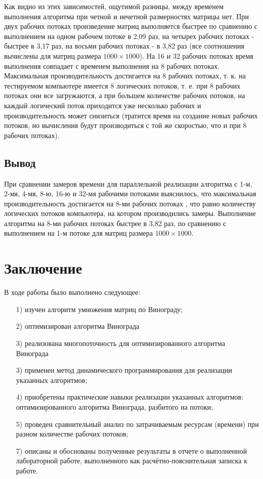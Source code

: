 \documentclass[a4paper,14pt]{article}
\begin{document}
        
        Как видно из этих зависимостей, ощутимой разницы, между временем выполнения алгоритма при четной и нечетной размерностях матрицы нет. При двух рабочих потоках произведение матриц выполняется быстрее по сравнению с выполнением на одном рабочем потоке в 2,09 раз, на четырех рабочих потоках - быстрее в 3,17 раз, на восьми рабочих потоках - в 3,82 раз (все соотношения вычислены для матриц размера $1000 \times 1000$). На 16 и 32 рабочих потоках время выполнения совпадает с временем выполнения на 8 рабочих потоках. Максимальная производительность достигается на 8 рабочих потоках, т. к. на тестируемом компьютере имеется 8 логических потоков, т. е. при 8 рабочих потоках они все загружаются, а при большем количестве рабочих потоков, на каждый логический поток приходится уже несколько рабочих и производительность может снизиться (тратится время на создание новых рабочих потоков, но вычисления будут производиться с той же скоростью, что и при 8 рабочих потоках).
        
     
        
       \subsection*{Вывод}
        При сравнении замеров времени для параллельной реализации алгоритма с 1-м, 2-мя, 4-мя, 8-ю, 16-ю и 32-мя рабочими потоками выяснилось, что максимальная производительность достигается на 8-ми рабочих потоках , что равно количеству логических потоков компьютера, на котором производились замеры. Выполнение алгоритма на 8-ми рабочих потоках быстрее в 3,82 раз, по сравнению с выполнением на 1-м потоке для матриц размера $1000 \times 1000$.
        
    

\pagebreak
\section*{Заключение}
	В ходе работы было выполнено следующее:
	\begin{enumerate} 
	\item[1)] изучен алгоритм умножения матриц по Винограду;
	\item[2)] оптимизирован алгоритма Винограда
	\item[3)] реализована многопоточность для оптимизированного алгоритма Винограда
	\item[3)] применен метод динамического программирования для реализации указанных алгоритмов;
	\item[4)] приобретены практические навыки реализации указанных алгоритмов: оптимизированного алгоритма Винограда, разбитого на потоки;
	\item[5)] проведен сравнительный анализ по затрачиваемым ресурсам (времени) при разном количестве рабочих потоков;
	\item[7)] описаны и обоснованы полученные результаты в отчете о выполненной лабораторной работе, выполненного как расчётно-пояснительная записка к работе. 
\end{enumerate} 
\end{document}
